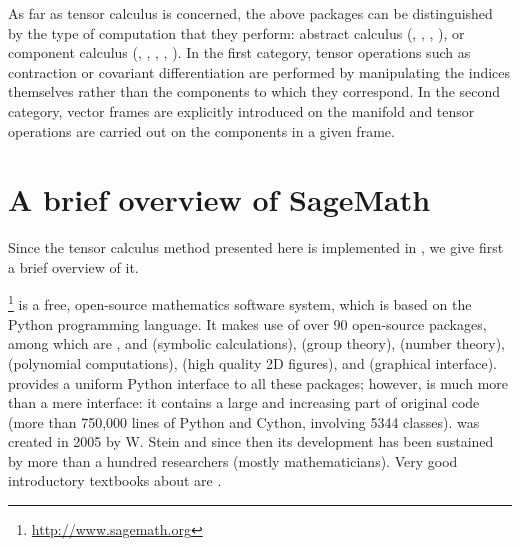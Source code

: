As far as tensor calculus is concerned, the above packages can be distinguished by
the type of computation that they perform:
abstract calculus (, , , ),
or component calculus (, , ,
, ).
In the first category, tensor operations such as contraction or covariant differentiation
are performed by manipulating the indices themselves rather than the components
to which they correspond. In the second category, vector frames are explicitly
introduced on the manifold and tensor operations are carried out on the components
in a given frame.



\section{A brief overview of SageMath} \label{s:int:overview_Sage}

Since the tensor calculus method presented here is implemented in \Sage{}, we
give first a brief overview of it.

\Sage{}\footnote{\url{http://www.sagemath.org}} is a free, open-source mathematics software system, which is
based on the Python programming language. It makes use of over 90 open-source packages,
among which are ,  and  (symbolic calculations),
 (group theory),
 (number theory),  (polynomial computations),
 (high quality 2D figures), and  (graphical interface).
\Sage{} provides a uniform Python interface to all these packages; however,
\Sage{} is much more than a mere interface: it contains a large and increasing part of
original code (more than 750,000 lines of Python and Cython, involving 5344 classes).
\Sage{} was created in 2005 by W. Stein \cite{SteinJ05} and since
then its development has been sustained by more than a hundred researchers
(mostly mathematicians). Very good introductory textbooks about \Sage{} are
\cite{JoyneS14,Zimme13,Zimme18,Bard15}.

